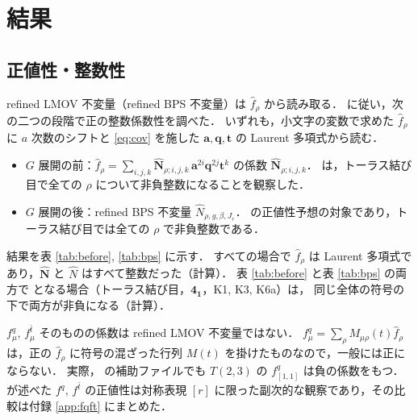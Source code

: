 \documentclass[11pt,a4paper]{ltjsarticle}
\theoremstyle{definition}
\theoremstyle{remark}
\newcommand{\ba}{\mathbf{a}}
\newcommand{\bq}{\mathbf{q}}
\newcommand{\bt}{\mathbf{t}}
\newcommand{\hN}{\widehat{N}}
\newcommand{\hf}{\widehat{f}}
\newcommand{\hbN}{\widehat{\mathbf{N}}}
\begin{document}
\section{結果}\label{sec:results}

\subsection{正値性・整数性}

refined LMOV 不変量（refined BPS 不変量）は $\hf_\rho$ から読み取る．\cite[\S4]{KN} に従い，次の二つの段階で正の整数係数性を調べた．
いずれも，小文字の変数で求めた $\hf_\rho$ に $a$ 次数のシフトと \eqref{eq:cov} を施した $\ba,\bq,\bt$ の Laurent 多項式から読む．
\begin{itemize}
\item $G$ 展開の前：$\hf_\rho=\sum_{i,j,k}\hbN_{\rho;i,j,k}\,\ba^{2i}\bq^{2j}\bt^k$ の係数 $\hbN_{\rho;i,j,k}$．
  \cite{KN} は，トーラス結び目で全ての $\rho$ について非負整数になることを観察した．
\item $G$ 展開の後：refined BPS 不変量 $\hN_{\rho,g,\beta,J_r}$．
  \cite{KN} の正値性予想の対象であり，トーラス結び目では全ての $\rho$ で非負整数である．
\end{itemize}
結果を表 \ref{tab:before}, \ref{tab:bps} に示す．
すべての場合で $\hf_\rho$ は Laurent 多項式であり，$\hbN$ と $\hN$ はすべて整数だった（計算）．
表 \ref{tab:before} と表 \ref{tab:bps} の両方で \checkmark となる場合（トーラス結び目，$\mathbf{4_1}$，K1, K3, K6a）は，
同じ全体の符号の下で両方が非負になる（計算）．

$f^q_\mu$, $f^{\bar t}_\mu$ そのものの係数は refined LMOV 不変量ではない．
$f^q_\mu=\sum_\rho M_{\mu\rho}(t)\hf_\rho$ は，正の $\hf_\rho$ に符号の混ざった行列 $M(t)$ を掛けたものなので，一般には正にならない．
実際，\cite{KN} の補助ファイルでも $T(2,3)$ の $f^q_{[1,1]}$ は負の係数をもつ．
\cite{KN} が述べた $f^q$, $f^{\bar t}$ の正値性は対称表現 $[r]$ に限った副次的な観察であり，その比較は付録 \ref{app:fqft} にまとめた．

\begin{table}[h]
\centering
\caption{$G$ 展開の前の正値性：$\hbN_{\rho;i,j,k}$（太字の変数での $\hf_\rho$ の係数）．記号は表 \ref{tab:bps} と同じ．}\label{tab:before}

\end{table}

\begin{table}[h]
\centering
\caption{$G$ 展開の後の正値性：refined BPS 不変量 $\hN_{\rho,g,\beta,J_r}$．
\checkmark は全体の符号を選べば全項が非負であることを表す．
$m/N$ は，全 $N$ 項のうち，全体の符号を選び直しても $m$ 項が負であることを表す．
$\dagger$ は，$(g,\beta)$ を固定したとき $2J_r$ の偶奇がそろわない組があることを表す．
上の 3 行は \cite{KN} の再現である．}\label{tab:bps}

\end{table}
\end{document}

